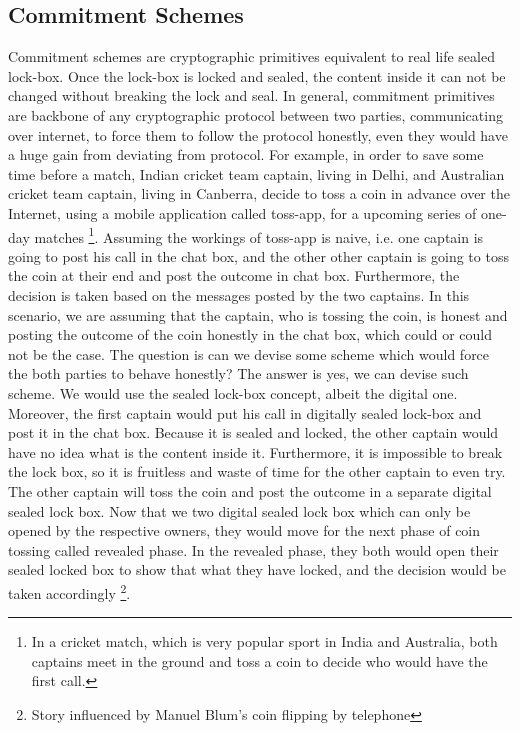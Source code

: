 \begin{enumerate}
{   
     \subsection{Commitment Schemes}   
     \label{sec:commscheme}
      Commitment schemes are cryptographic primitives equivalent to real life sealed lock-box.
      Once the lock-box is locked and sealed, the content inside it can not be changed without breaking the lock and seal. 
      In general, commitment primitives 
      are backbone of any cryptographic protocol between two parties, communicating over internet, to force them  to  follow the 
      protocol honestly, even they would have a huge gain from deviating 
      from protocol. For example, in order to save some time before a match, Indian cricket team captain, living in Delhi, and Australian cricket 
      team captain, living in Canberra, decide 
      to toss a coin in advance over the Internet, using a mobile application  called toss-app, for a  upcoming series of one-day matches
      \footnote{
      In a cricket match, which is very popular sport in India and Australia, both captains meet in the ground and toss a coin to 
      decide who would have the first call.}.  Assuming the workings of toss-app is naive, i.e. one captain is going to post
      his call in the chat box, and the other other captain is going to toss the coin at their end and post the outcome in chat box. 
      Furthermore, the decision is taken based on the messages posted by the two captains. In this scenario, we are assuming that 
      the captain, who is tossing the coin, is honest and posting the outcome of the coin honestly in the chat box, which could or 
      could not be the case.  The question is can we devise some scheme which would force the both parties to behave honestly? 
      The answer is yes, we can devise such scheme. We would use the sealed lock-box concept, albeit the digital one. Moreover, 
      the first captain would put his call in digitally sealed lock-box and post it in the chat box. Because it is sealed and 
      locked, the other captain would have no idea what is the content inside it. Furthermore, it is impossible to break 
      the lock box, so it is fruitless and waste of time for the other captain to even try. The other captain will toss the coin 
      and post the outcome in a separate digital sealed lock box. Now that we two digital sealed lock box which can 
      only be opened by the respective owners, they would move for the next phase of coin tossing  called revealed phase. 
      In the revealed phase, they both would open their sealed locked box to show that what they have locked, 
      and the decision would be taken accordingly \footnote{Story influenced by Manuel Blum's coin flipping by telephone}. 
      
}
\end{enumerate}
